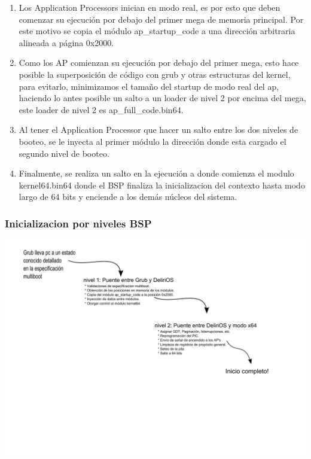 \documentclass{beamer}
\begin{document}
\begin{frame}
\begin{itemize}
\begin{enumerate}
\begin{enumerate}
					\item Los Application Processors inician en modo real, es por esto que deben comenzar su ejecución por debajo del primer mega de memoria principal. Por este motivo se copia el módulo ap\_startup\_code a una dirección arbitraria alineada a página 0x2000.
					\vspace{0.1cm}
					\item Como los AP comienzan su ejecución por debajo del primer mega, esto hace posible la superposición de código con grub y otras estructuras del kernel, para evitarlo, minimizamos el tamaño del startup de modo real del ap, haciendo lo antes posible un salto a un loader de nivel 2 por encima del mega, este loader de nivel 2 es ap\_full\_code.bin64.
					\vspace{0.1cm}
					\item Al tener el Application Processor que hacer un salto entre los dos niveles de booteo, se le inyecta al primer módulo la dirección donde esta cargado el segundo nivel de booteo.
					\vspace{0.1cm}
					\item Finalmente, se realiza un salto en la ejecución a donde comienza el modulo kernel64.bin64 donde el BSP finaliza la inicializacion del contexto hasta modo largo de 64 bits y enciende a los demás núcleos del sistema.
				\end{enumerate}
			\end{enumerate}
	\end{itemize}
	\end{frame}

	\begin{frame}
		\frametitle{Inicializacion por niveles BSP}
		\begin{center}
			\includegraphics[height=9.5cm]{images/bsp-stages-diagram.pdf} 
		\end{center}
	\end{frame}
\end{document}

